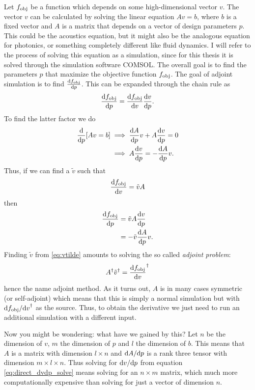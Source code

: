 Let $f_\text{obj}$ be a function which depends on some high-dimensional vector $v$.
The vector $v$ can be calculated by solving the linear equation
$A v = b$, where $b$ is a fixed vector and $A$ is a matrix that depends on a
vector of design parameters $p$.
This could be the acoustics equation, but it might also be the analogous
equation for photonics, or something completely different like fluid dynamics.
I will refer to the process of solving this equation as a simulation, since for
this thesis it is solved through the simulation software COMSOL.
The overall goal is to find the parameters $p$ that maximize the objective
function $f_\text{obj}$.
The goal of adjoint simulation is to find $\diff{\fobj}{p}$.
This can be expanded through the chain rule as
\begin{equation}
	\diff{\fobj}{p} = \diff{\fobj}{v} \diff{v}{p}.
\end{equation}
To find the latter factor we do
\begin{align}
	\diff{}{p} [Av = b] &\implies \diff{A}{p} v + A \diff{v}{p} = 0\\
						&\implies A\diff{v}{p} = -\diff{A}{p}
						v.\label{eq:direct_dvdp_solve}
\end{align}
Thus, if we can find a $\tilde v$ such that
\begin{equation}\label{eq:vtilde}
	\diff{\fobj}{v} = \tilde v A
\end{equation}
then
\begin{align}
	\label{eq:dfdp_vtilde}
	\diff{\fobj}{p} &=
	\tilde v A \diff{v}{p}\\
	&=
	-\tilde v \diff{A}{p} v.
\end{align}
Finding $\tilde v$ from \cref{eq:vtilde} amounts to solving the so called
\emph{adjoint problem}:
\begin{equation}
	A^\dagger \tilde v^\dagger = \diff{\fobj}{v}^\dagger
\end{equation}
hence the name adjoint method.
As it turns out, $A$ is in many cases symmetric (or self-adjoint) which means that this is simply a normal
simulation but with $\difs{\fobj}{v}^\dagger$ as the source.
Thus, to obtain the derivative we just need to run an additional
simulation with a different input.

Now you might be wondering: what have we gained by this?
Let $n$ be the dimension of $v$, $m$ the dimension of $p$ and $l$ the dimension
of $b$.
This means that $A$ is a matrix with dimension $l\times n$ and $\difs{A}{p}$ is
a rank three tensor with dimension $m\times l\times n$.
Thus solving for $\difs{v}{p}$ from equation \cref{eq:direct_dvdp_solve}
means solving for an $n \times m$ matrix, which much more computationally
expensive than solving for just a vector of dimension $n$.

